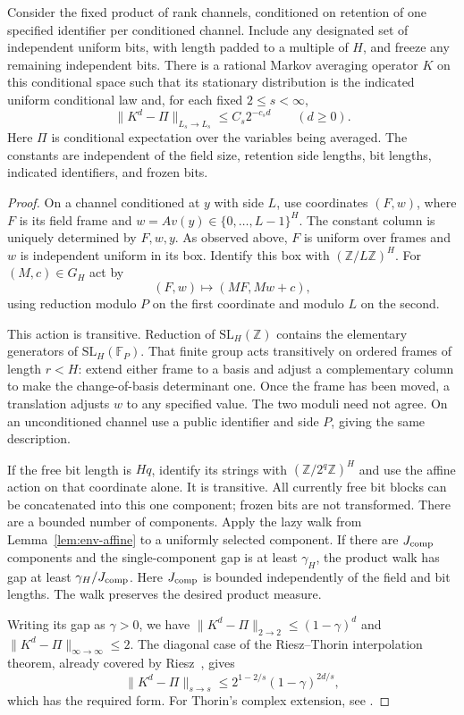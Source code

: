 \begin{lemma}\label{lem:env-gap}
Consider the fixed product of rank channels, conditioned on retention of
one specified identifier per conditioned channel. Include any designated
set of independent uniform bits, with length padded to a multiple of
$H$, and freeze any remaining independent bits.
There is a rational Markov averaging operator $K$ on this conditional
space such that its stationary distribution is the indicated uniform
conditional law and, for each fixed $2\le s<\infty$,
\[
\|K^d-\Pi\|_{L_s\to L_s}\le C_s2^{-c_sd}
\qquad(d\ge0).
\]
Here $\Pi$ is conditional expectation over the variables being averaged.
The constants are independent of the field size, retention side
lengths, bit lengths, indicated identifiers, and frozen bits.
\end{lemma}

\begin{proof}
On a channel conditioned at $y$ with side $L$, use coordinates
$(F,w)$, where $F$ is its field frame and
$w=Av(y)\in\{0,\ldots,L-1\}^H$. The constant column is uniquely
determined by $F,w,y$. As observed above, $F$ is uniform over frames
and $w$ is independent uniform in its box. Identify this box with
$(\mathbb Z/L\mathbb Z)^H$.
For $(M,c)\in G_H$ act by
\[
(F,w)\longmapsto(MF,Mw+c),
\]
using reduction modulo $P$ on the first coordinate and modulo $L$
on the second.

This action is transitive. Reduction of $\mathrm{SL}_H(\mathbb Z)$
contains the elementary generators of $\mathrm{SL}_H(\mathbb F_P)$.
That finite group acts transitively on ordered frames of length
$r<H$: extend either frame to a basis and adjust a complementary
column to make the change-of-basis determinant one. Once the frame
has been moved, a translation adjusts $w$ to any specified value.
The two moduli need not agree. On an unconditioned channel use a
public identifier and side $P$, giving the same description.

If the free bit length is $Hq$, identify its strings with
$(\mathbb Z/2^q\mathbb Z)^H$ and use the affine action on that
coordinate alone. It is transitive. All currently free bit blocks
can be concatenated into this one component; frozen bits are not
transformed.
There are a bounded number of components. Apply the lazy walk from
Lemma~\ref{lem:env-affine} to a uniformly selected component.
If there are $J_{\rm comp}$ components and the single-component gap is
at least $\gamma_H$, the product walk has gap at least
$\gamma_H/J_{\rm comp}$. Here $J_{\rm comp}$ is bounded independently
of the field and bit lengths. The walk preserves the desired product
measure.

Writing its gap as $\gamma>0$, we have
$\|K^d-\Pi\|_{2\to2}\le(1-\gamma)^d$ and
$\|K^d-\Pi\|_{\infty\to\infty}\le2$.
The diagonal case of the Riesz--Thorin interpolation theorem, already
covered by Riesz~\cite[Theorems~II and~II$'$, p.~472]{Riesz1927}, gives
\[
\|K^d-\Pi\|_{s\to s}
\le 2^{1-2/s}(1-\gamma)^{2d/s},
\]
which has the required form. For Thorin's complex extension, see
\cite[Introduction, \S0.1; Russian translation, pp.~43--45]{Thorin1948}.
\end{proof}

